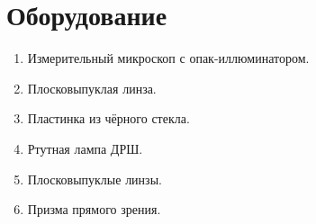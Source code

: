 \section*{Оборудование}

\begin{enumerate}
	\item Измерительный микроскоп с опак-иллюминатором.

	\item Плосковыпуклая линза.

	\item Пластинка из чёрного стекла.

	\item Ртутная лампа ДРШ.

	\item Плосковыпуклые линзы.

	\item Призма прямого зрения.
\end{enumerate}